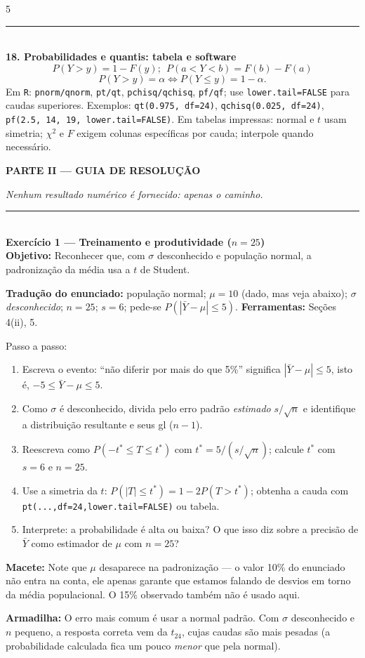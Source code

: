 \documentclass[a4paper,8pt]{extarticle}
\newcommand{\tit}[1]{\vspace{2pt}\textcolor{azul}{\rule{\linewidth}{0.6pt}}\\[1pt]\textbf{\textcolor{azul}{#1}}\\[1pt]}
\newcommand{\mac}[1]{\textcolor{verde}{\textbf{Macete:}} #1\par}
\newcommand{\arm}[1]{\textcolor{vinho}{\textbf{Armadilha:}} #1\par}
\newcommand{\ferr}[1]{\textbf{Ferramentas:} #1\par}
\newcommand{\obj}[1]{\textbf{Objetivo:} #1\par}
\newcommand{\R}[1]{\texttt{\footnotesize #1}}
\begin{document}
\begin{multicols*}{5}
\tit{18. Probabilidades e quantis: tabela e software}
\[P(Y>y)=1-F(y);\ \ P(a<Y<b)=F(b)-F(a)\]
\[P(Y>y)=\alpha \iff P(Y\le y)=1-\alpha .\]
Em \R{R}: \R{pnorm/qnorm}, \R{pt/qt}, \R{pchisq/qchisq}, \R{pf/qf}; use \R{lower.tail=FALSE} para caudas superiores. Exemplos: \R{qt(0.975, df=24)}, \R{qchisq(0.025, df=24)}, \R{pf(2.5, 14, 19, lower.tail=FALSE)}.
Em tabelas impressas: normal e $t$ usam simetria; $\chi^2$ e $F$ exigem colunas específicas por cauda; interpole quando necessário.

\vspace{4pt}
\begin{center}\colorbox{cinza}{\parbox{0.94\linewidth}{\centering\bfseries\color{azul} PARTE II — GUIA DE RESOLUÇÃO}}\end{center}
\textit{Nenhum resultado numérico é fornecido: apenas o caminho.}

\tit{Exercício 1 — Treinamento e produtividade ($n=25$)}
\obj{Reconhecer que, com $\sigma$ desconhecido e população normal, a padronização da média usa a $t$ de Student.}
\textbf{Tradução do enunciado:} população normal; $\mu=10$ (dado, mas veja abaixo); $\sigma$ \emph{desconhecido}; $n=25$; $s=6$; pede-se $P(|\bar Y-\mu|\le 5)$.
\ferr{Seções 4(ii), 5.}
Passo a passo:
\begin{enumerate}
\item Escreva o evento: “não diferir por mais do que 5\%” significa $|\bar Y-\mu|\le 5$, isto é, $-5\le \bar Y-\mu\le 5$.
\item Como $\sigma$ é desconhecido, divida pelo erro padrão \emph{estimado} $s/\sqrt n$ e identifique a distribuição resultante e seus gl ($n-1$).
\item Reescreva como $P(-t^\ast\le T\le t^\ast)$ com $t^\ast=5/(s/\sqrt n)$; calcule $t^\ast$ com $s=6$ e $n=25$.
\item Use a simetria da $t$: $P(|T|\le t^\ast)=1-2P(T>t^\ast)$; obtenha a cauda com \R{pt(...,df=24,lower.tail=FALSE)} ou tabela.
\item Interprete: a probabilidade é alta ou baixa? O que isso diz sobre a precisão de $\bar Y$ como estimador de $\mu$ com $n=25$?
\end{enumerate}
\mac{Note que $\mu$ desaparece na padronização — o valor 10\% do enunciado não entra na conta, ele apenas garante que estamos falando de desvios em torno da média populacional. O 15\% observado também não é usado aqui.}
\arm{O erro mais comum é usar a normal padrão. Com $\sigma$ desconhecido e $n$ pequeno, a resposta correta vem da $t_{24}$, cujas caudas são mais pesadas (a probabilidade calculada fica um pouco \emph{menor} que pela normal).}


\end{multicols*}
\end{document}
